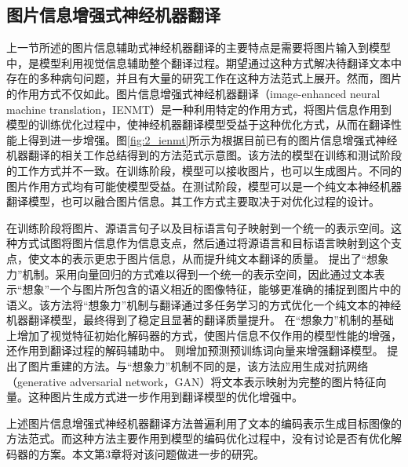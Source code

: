 \subsection{图片信息增强式神经机器翻译}

上一节所述的图片信息辅助式神经机器翻译的主要特点是需要将图片输入到模型中，是模型利用视觉信息辅助整个翻译过程。期望通过这种方式解决待翻译文本中存在的多种病句问题，并且有大量的研究工作在这种方法范式上展开。然而，图片的作用方式不仅如此。图片信息增强式神经机器翻译（image-enhanced neural machine translation，IENMT）是一种利用特定的作用方式，将图片信息作用到模型的训练优化过程中，使神经机器翻译模型受益于这种优化方式，从而在翻译性能上得到进一步增强。图\ref{fig:2_ienmt}所示为根据目前已有的图片信息增强式神经机器翻译的相关工作总结得到的方法范式示意图。该方法的模型在训练和测试阶段的工作方式并不一致。在训练阶段，模型可以接收图片，也可以生成图片。不同的图片作用方式均有可能使模型受益。在测试阶段，模型可以是一个纯文本神经机器翻译模型，也可以融合图片信息。其工作方式主要取决于对优化过程的设计。

在训练阶段将图片、源语言句子以及目标语言句子映射到一个统一的表示空间。这种方式试图将图片信息作为信息支点，然后通过将源语言和目标语言映射到这个支点，使文本的表示更忠于图片信息，从而提升纯文本翻译的质量。
提出了“想象力”机制。采用向量回归的方式难以得到一个统一的表示空间，因此通过文本表示“想象”一个与图片所包含的语义相近的图像特征，能够更准确的捕捉到图片中的语义。该方法将“想象力”机制与翻译通过多任务学习的方式优化一个纯文本的神经机器翻译模型，最终得到了稳定且显著的翻译质量提升。
在“想象力”机制的基础上增加了视觉特征初始化解码器的方式，使图片信息不仅作用的模型性能的增强，还作用到翻译过程的解码辅助中。
则增加预测预训练词向量来增强翻译模型。
提出了图片重建的方法。与“想象力”机制不同的是，该方法应用生成对抗网络（generative adversarial network，GAN）将文本表示映射为完整的图片特征向量。这种图片生成方式进一步作用到翻译模型的优化增强中。

上述图片信息增强式神经机器翻译方法普遍利用了文本的编码表示生成目标图像的方法范式。而这种方法主要作用到模型的编码优化过程中，没有讨论是否有优化解码器的方案。本文第3章将对该问题做进一步的研究。